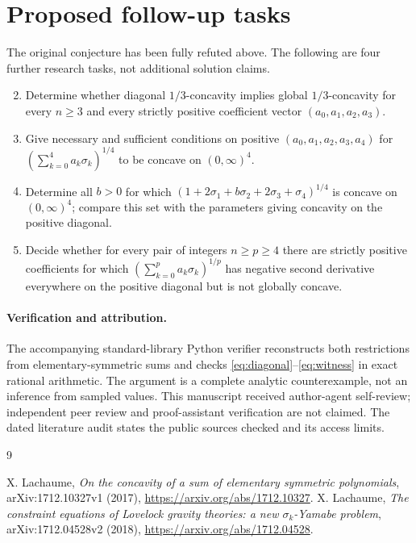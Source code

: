 \documentclass[11pt]{article}
\begin{document}
\section*{Proposed follow-up tasks}
The original conjecture has been fully refuted above. The following
are four further research tasks, not additional solution claims.
\begin{enumerate}
\setcounter{enumi}{1}
\item Determine whether diagonal $1/3$-concavity implies global
$1/3$-concavity for every $n\ge3$ and every strictly positive
coefficient vector $(a_0,a_1,a_2,a_3)$.
\item Give necessary and sufficient conditions on positive
$(a_0,a_1,a_2,a_3,a_4)$ for
$(\sum_{k=0}^4a_k\sigma_k)^{1/4}$ to be concave on $(0,\infty)^4$.
\item Determine all $b>0$ for which
$(1+2\sigma_1+b\sigma_2+2\sigma_3+\sigma_4)^{1/4}$
is concave on $(0,\infty)^4$; compare this set with the parameters
giving concavity on the positive diagonal.
\item Decide whether for every pair of integers $n\ge p\ge4$ there
are strictly positive coefficients for which
$(\sum_{k=0}^pa_k\sigma_k)^{1/p}$ has negative second derivative
everywhere on the positive diagonal but is not globally concave.
\end{enumerate}

\paragraph{Verification and attribution.}
The accompanying standard-library Python verifier reconstructs both
restrictions from elementary-symmetric sums and checks
\eqref{eq:diagonal}--\eqref{eq:witness} in exact rational arithmetic.
The argument is a complete analytic counterexample, not an inference
from sampled values. This manuscript received author-agent self-review;
independent peer review and proof-assistant verification are not claimed.
The dated literature audit states the public sources checked and its
access limits.

\begin{thebibliography}{9}
\raggedright
{}
X. Lachaume, \emph{On the concavity of a sum of elementary symmetric
polynomials}, arXiv:1712.10327v1 (2017),
\url{https://arxiv.org/abs/1712.10327}.
X. Lachaume, \emph{The constraint equations of Lovelock gravity theories:
a new $\sigma_k$-Yamabe problem}, arXiv:1712.04528v2 (2018),
\url{https://arxiv.org/abs/1712.04528}.
\end{thebibliography}
\end{document}
